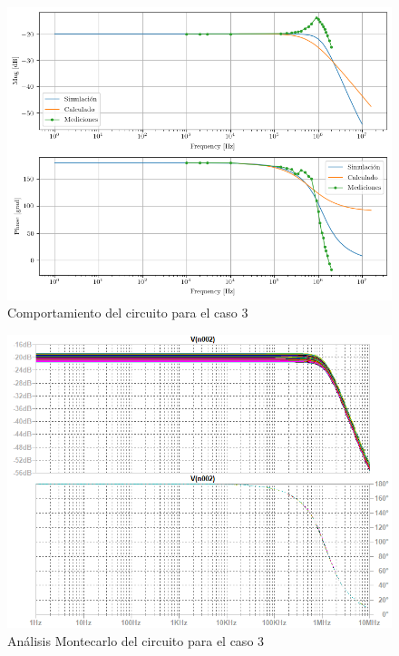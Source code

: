 \begin{figure}[H]
\begin{centering}
\includegraphics[scale=0.5]{../Ex1/iA/Resources1a/H3}
\par\end{centering}
\caption{Comportamiento del circuito para el caso 3}
\label{1_a_2_c}

\end{figure}

\begin{figure}[H]
\begin{centering}
\includegraphics[scale=0.5]{../Ex1/iA/Resources1a/montecarlo1a_3}
\par\end{centering}
\caption{Análisis Montecarlo del circuito para el caso 3}

\end{figure}

